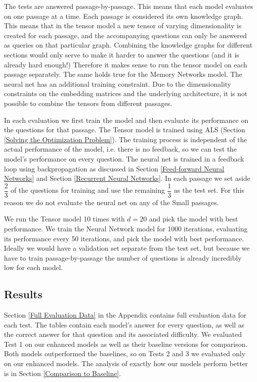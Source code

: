 \documentclass[pageno]{jpaper}
\begin{document}
The tests are answered passage-by-passage. This means that each model evaluates
on one passage at a time. Each passage is considered its own knowledge graph.
This means that in the tensor model a new tensor of varying dimensionality is
created for each passage, and the accompanying questions can only be answered as
queries on that particular graph. Combining the knowledge graphs for different
sections would only serve to make it harder to answer the questions (and it is
already hard enough!) Therefore it makes sense to run the tensor model on each
passage separately. The same holds true for the Memory Networks model. The
neural net has an additional training constraint. Due to the dimensionality
constraints on the embedding matrices and the underlying architecture, it is
not possible to combine the tensors from different passages.

In each evaluation we first train the model and then evaluate its performance on
the questions for that passage. The Tensor model is trained using ALS (Section
\ref{Solving the Optimization Problem}). The training process is independent of
the actual performance of the model, i.e. there is no feedback, so we can test
the model's performance on every question. The neural net is trained in a
feedback loop using backpropagation as discussed in Section \ref{Feed-forward
Neural Networks} and Section \ref{Recurrent Neural Networks}. In each passage we
set aside $\dfrac{2}{3}$ of the questions for training and use the remaining
$\dfrac{1}{3}$ as the test set. For this reason we do not evaluate the neural
net on any of the Small passages.

We run the Tensor model 10 times with $d=20$ and pick the model with best
performance. We train the Neural Network model for 1000 iterations, evaluating
its performance every 50 iterations, and pick the model with best performance.
Ideally we would have a validation set separate from the test set, but because
we have to train passage-by-passage the number of questions is already
incredibly low for each model.

\subsection{Results}
\label{Results}

Section \ref{Full Evaluation Data} in the Appendix contains full evaluation data
for each test. The tables contain each model's answer for every question, as
well as the correct answer for that question and its associated difficulty. We
evaluated Test 1 on our enhanced models as well as their baseline versions for
comparison. Both models outperformed the baselines, so on Tests 2 and 3 we
evaluated only on our enhanced models. The analysis of exactly how our models
perform better is in Section \ref{Comparison to Baseline}.
\end{document}
